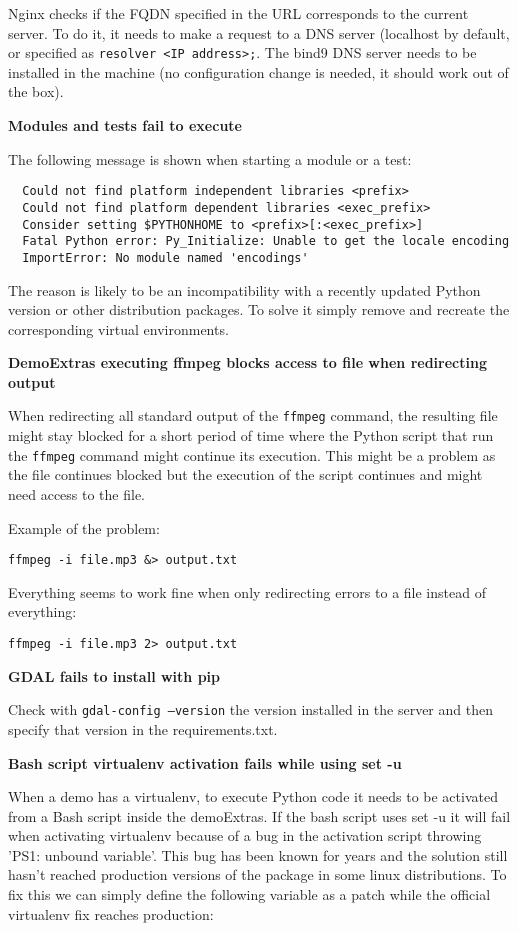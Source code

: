 \documentclass[a4paper,12pt]{article}
\begin{document}
Nginx checks if the FQDN specified in the URL corresponds to the current server. To do it, it needs to make a request to a DNS server (localhost by default, or specified as {\tt resolver <IP address>;}. The bind9 DNS server needs to be installed in the machine (no configuration change is needed, it should work out of the box).
\vspace{0.5cm}

\textbf{Modules and tests fail to execute}

The following message is shown when starting a module or a test:

\begin{verbatim}  
  Could not find platform independent libraries <prefix>
  Could not find platform dependent libraries <exec_prefix>
  Consider setting $PYTHONHOME to <prefix>[:<exec_prefix>]
  Fatal Python error: Py_Initialize: Unable to get the locale encoding
  ImportError: No module named 'encodings'
\end{verbatim}

The reason is likely to be an incompatibility with a recently updated Python version or other distribution packages. To solve it simply remove and recreate the corresponding virtual environments.

\textbf{DemoExtras executing ffmpeg blocks access to file when redirecting output}

When redirecting all standard output of the {\tt ffmpeg} command, the resulting file might stay blocked for a short period of time where the Python script that run the {\tt ffmpeg} command might continue its execution. This might be a problem as the file continues blocked but the execution of the script continues and might need access to the file.

Example of the problem:

{\tt ffmpeg -i file.mp3 \&> output.txt}

Everything seems to work fine when only redirecting errors to a file instead of everything:

{\tt ffmpeg -i file.mp3 2> output.txt}

\textbf{GDAL fails to install with pip}

Check with {\tt gdal-config --version} the version installed in the server and then specify that version in the requirements.txt.

\textbf{Bash script virtualenv activation fails while using set -u}

When a demo has a virtualenv, to execute Python code it needs to be activated from a Bash script inside the demoExtras. If the bash script uses set -u it will fail when activating virtualenv because of a bug in the activation script throwing 'PS1: unbound variable'. This bug has been known for years and the solution still hasn't reached production versions of the package in some linux distributions. To fix this we can simply define the following variable as a patch while the official virtualenv fix reaches production:
\end{document}
